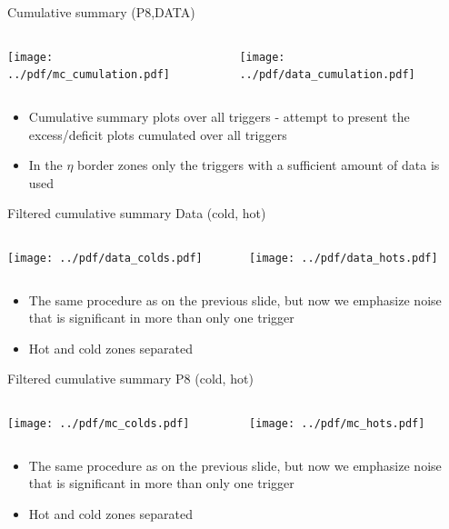 \documentclass[9pt]{beamer}
\begin{document}
\begin{frame}[t]{Cumulative summary (P8,DATA)}
\begin{columns}[T]
  \begin{column}{.5\textwidth}
  \texttt{[image: ../pdf/mc\_cumulation.pdf]}
  \end{column}
  \begin{column}{.5\textwidth}
  \texttt{[image: ../pdf/data\_cumulation.pdf]}
  \end{column}
\end{columns}
\begin{itemize}
 \item Cumulative summary plots over all triggers - attempt to present the excess/deficit plots cumulated over all triggers
 \item In the $\eta$ border zones only the triggers with a sufficient amount of data is used
\end{itemize}
\end{frame}

\begin{frame}[t]{Filtered cumulative summary Data (cold, hot)}
\begin{columns}[T]
  \begin{column}{.5\textwidth}
  \texttt{[image: ../pdf/data\_colds.pdf]}
  \end{column}
  \begin{column}{.5\textwidth}
  \texttt{[image: ../pdf/data\_hots.pdf]}
  \end{column}
\end{columns}
\begin{itemize}
 \item The same procedure as on the previous slide, but now we emphasize noise that is significant in more than only one trigger
 \item Hot and cold zones separated
\end{itemize}
\end{frame}

\begin{frame}[t]{Filtered cumulative summary P8 (cold, hot)}
\begin{columns}[T]
  \begin{column}{.5\textwidth}
  \texttt{[image: ../pdf/mc\_colds.pdf]}
  \end{column}
  \begin{column}{.5\textwidth}
  \texttt{[image: ../pdf/mc\_hots.pdf]}
  \end{column}
\end{columns}
\begin{itemize}
 \item The same procedure as on the previous slide, but now we emphasize noise that is significant in more than only one trigger
 \item Hot and cold zones separated
\end{itemize}
\end{frame}
\end{document}

